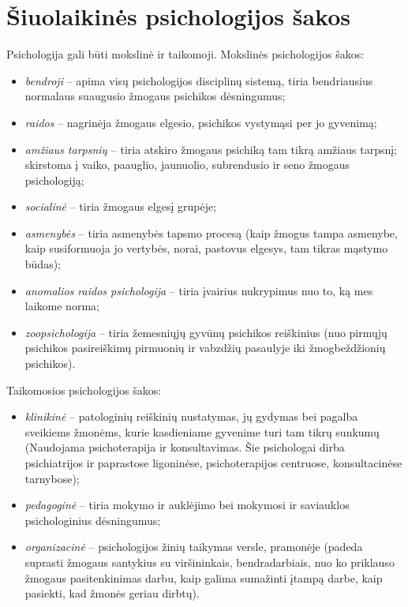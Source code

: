 \section{Šiuolaikinės psichologijos šakos}

\label{tema:psichologijos_sakos}

Psichologija gali būti mokslinė ir taikomoji. Mokslinės psichologijos
šakos:
\begin{itemize}
  \item \emph{bendroji} – apima visų psichologijos disciplinų sistemą,
    tiria bendriausius normalaus suaugusio žmogaus psichikos dėsningumus;
  \item \emph{raidos} – nagrinėja žmogaus elgesio, psichikos vystymąsi per 
    jo gyvenimą;
  \item \emph{amžiaus tarpsnių} – tiria atskiro žmogaus psichiką tam tikrą
    amžiaus tarpsnį; skirstoma į vaiko, paauglio, jaunuolio, subrendusio
    ir seno žmogaus psichologiją;
  \item \emph{socialinė} – tiria žmogaus elgesį grupėje;
  \item \emph{asmenybės} – tiria asmenybės tapsmo procesą (kaip žmogus tampa
    asmenybe, kaip susiformuoja jo vertybės, norai, pastovus elgesys,
    tam tikras mąstymo būdas);
  \item \emph{anomalios raidos psichologija} – tiria įvairius nukrypimus 
    nuo to, ką mes laikome norma;
  \item \emph{zoopsichologija} – tiria žemesniųjų gyvūnų psichikos 
    reiškinius (nuo pirmųjų psichikos pasireiškimų pirmuonių ir vabzdžių
    pasaulyje iki žmogbeždžionių psichikos).
\end{itemize}
Taikomosios psichologijos šakos:
\begin{itemize}
  \item \emph{klinikinė} – patologinių reiškinių nustatymas, jų gydymas bei
    pagalba sveikiems žmonėms, kurie kasdieniame gyvenime turi tam tikrų
    sunkumų (Naudojama psichoterapija ir konsultavimas. Šie psichologai
    dirba psichiatrijos ir paprastose ligoninėse, psichoterapijos 
    centruose, konsultacinėse tarnybose);
  \item \emph{pedagoginė} – tiria mokymo ir auklėjimo bei mokymosi ir saviauklos
    psichologinius dėsningumus;
  \item \emph{organizacinė} – psichologijos žinių taikymas versle, pramonėje
    (padeda suprasti žmogaus santykius su viršininkais, bendradarbiais,
    nuo ko priklauso žmogaus pasitenkinimas darbu, kaip galima sumažinti
    įtampą darbe, kaip pasiekti, kad žmonės geriau dirbtų).
\end{itemize}

